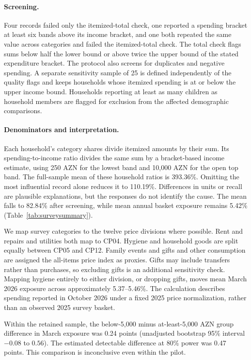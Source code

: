 \documentclass[11pt,a4paper]{article}
\begin{document}
\paragraph{Screening.} Four records failed only the itemized-total check, one reported a spending bracket at least six bands above its income bracket, and one both repeated the same value across categories and failed the itemized-total check. The total check flags sums below half the lower bound or above twice the upper bound of the stated expenditure bracket. The protocol also screens for duplicates and negative spending. A separate sensitivity sample of 25 is defined independently of the quality flags and keeps households whose itemized spending is at or below the upper income bound. Households reporting at least as many children as household members are flagged for exclusion from the affected demographic comparisons.

\paragraph{Denominators and interpretation.} Each household's category shares divide itemized amounts by their sum. Its spending-to-income ratio divides the same sum by a bracket-based income estimate, using 250 AZN for the lowest band and 10,000 AZN for the open top band. The full-sample mean of these household ratios is 393.36\%. Omitting the most influential record alone reduces it to 110.19\%. Differences in units or recall are plausible explanations, but the responses do not identify the cause. The mean falls to 82.84\% after screening, while mean annual basket exposure remains 5.42\% (Table~\ref{tab:surveysummary}).

We map survey categories to the twelve price divisions where possible. Rent and repairs and utilities both map to CP04. Hygiene and household goods are split equally between CP05 and CP12. Family events and gifts and other consumption are assigned the all-items price index as proxies. Gifts may include transfers rather than purchases, so excluding gifts is an additional sensitivity check. Mapping hygiene entirely to either division, or dropping gifts, moves mean March 2026 exposure across approximately 5.37--5.46\%. The calculation describes spending reported in October 2026 under a fixed 2025 price normalization, rather than an observed 2025 survey basket.

Within the retained sample, the below-5,000 minus at-least-5,000 AZN group difference in March exposure was 0.24 points (unadjusted bootstrap 95\% interval $-0.08$ to $0.56$). The estimated detectable difference at 80\% power was 0.47 points. This comparison is inconclusive even within the pilot.
\end{document}
